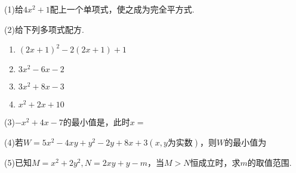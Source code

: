 \begin{exercise}
\small
    \setlength{\parindent}{0pt} %
    \setlength{\columnseprule}{0.01pt}
    \begin{multicols}{2}
        \begin{minipage}{1\linewidth}
        (1)给\( 4x^2 +1\)配上一个单项式，使之成为完全平方式.
        \end{minipage}
        
        \begin{minipage}{1\linewidth}
        (2)给下列多项式配方.
        \begin{enumerate}
            \item \((2x+1)^2-2(2x+1)+1\)
            \item \(3x^2-6x-2\)
            \item \(3x^2+8x-3\)
            \item \(x^2+2x+10\)
        \end{enumerate}
        \end{minipage}
        \begin{minipage}{1\linewidth}
        (3)\(-x^2+4x-7\)的最小值是\underline{\hspace{3.5em}}，此时\(x=\)\underline{\hspace{3.5em}}
        \end{minipage}

        \begin{minipage}{1\linewidth}
        (4)若\(W=5x^2-4xy+y^2-2y+8x+3(x,y\text{为实数})，\text{则}W\)的最小值为\underline{\hspace{3.5em}}
        \end{minipage}

        (5)已知\(M=x^2+2y^2, N=2xy+y-m\)，当\(M>N\)恒成立时，求\(m\)的取值范围.
        
    \end{multicols}
\end{exercise}






